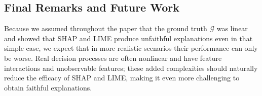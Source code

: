 \documentclass[mnsc,blindrev]{informs3}
\begin{document}
\subsection{Final Remarks and Future Work}
    Because we assumed throughout the paper that the ground truth $\mathcal{G}$ was linear and showed that SHAP and LIME produce unfaithful explanations even in that simple case, we expect that in more realistic scenarios their performance can only be worse. Real decision processes are often nonlinear and have feature interactions and unobservable features; these added complexities should naturally reduce the efficacy of SHAP and LIME, making it even more challenging to obtain faithful explanations. 


 


        




\end{document}
